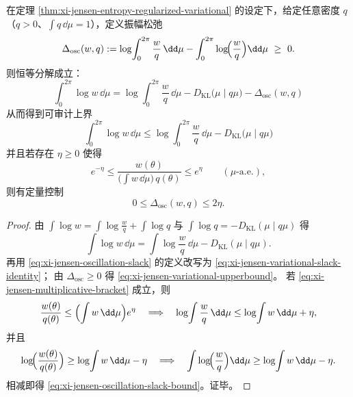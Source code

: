 \begin{proposition}\label{prop:xi-jensen-variational-upperbound-certificate}
在定理 \ref{thm:xi-jensen-entropy-regularized-variational} 的设定下，给定任意密度 \(q\)（\(q>0\)、\(\int q\,\dd\mu=1\)），定义振幅松弛
\begin{equation}\label{eq:xi-jensen-oscillation-slack}
\Delta_{\mathrm{osc}}(w,q)
:=\log\!\int_{0}^{2\pi}\frac{w}{q}\,\dd\mu-\int_{0}^{2\pi}\log\!\Bigl(\frac{w}{q}\Bigr)\dd\mu\ \ge\ 0.
\end{equation}
则恒等分解成立：
\begin{equation}\label{eq:xi-jensen-variational-slack-identity}
\boxed{\;
\int_{0}^{2\pi}\log w\,\dd\mu
=\log\!\int_{0}^{2\pi}\frac{w}{q}\,\dd\mu
-D_{\mathrm{KL}}\!\bigl(\mu\mid q\mu\bigr)
-\Delta_{\mathrm{osc}}(w,q)\;}
\end{equation}
从而得到可审计上界
\begin{equation}\label{eq:xi-jensen-variational-upperbound}
\boxed{\;
\int_{0}^{2\pi}\log w\,\dd\mu
\le
\log\!\int_{0}^{2\pi}\frac{w}{q}\,\dd\mu
-D_{\mathrm{KL}}\!\bigl(\mu\mid q\mu\bigr)\;}
\end{equation}
并且若存在 \(\eta\ge 0\) 使得
\begin{equation}\label{eq:xi-jensen-multiplicative-bracket}
e^{-\eta}\le \frac{w(\theta)}{\bigl(\int w\,\dd\mu\bigr)\,q(\theta)}\le e^{\eta}\qquad(\mu\text{-a.e.}),
\end{equation}
则有定量控制
\begin{equation}\label{eq:xi-jensen-oscillation-slack-bound}
\boxed{\;0\le \Delta_{\mathrm{osc}}(w,q)\le 2\eta.\;}
\end{equation}
\end{proposition}

\begin{proof}
由
\(
\int\log w=\int\log\frac{w}{q}+\int\log q
\)
与 \(\int\log q=-D_{\mathrm{KL}}(\mu\mid q\mu)\) 得
\[
\int\log w\,\dd\mu
=\int\log\frac{w}{q}\,\dd\mu-D_{\mathrm{KL}}(\mu\mid q\mu).
\]
再用 \eqref{eq:xi-jensen-oscillation-slack} 的定义改写为 \eqref{eq:xi-jensen-variational-slack-identity}；
由 \(\Delta_{\mathrm{osc}}\ge 0\) 得 \eqref{eq:xi-jensen-variational-upperbound}。
若 \eqref{eq:xi-jensen-multiplicative-bracket} 成立，则
\[
\frac{w(\theta)}{q(\theta)}\le \Bigl(\int w\,\dd\mu\Bigr)e^{\eta}
\quad\Longrightarrow\quad
\log\!\int\frac{w}{q}\,\dd\mu\le \log\!\int w\,\dd\mu+\eta,
\]
并且
\[
\log\!\Bigl(\frac{w(\theta)}{q(\theta)}\Bigr)\ge \log\!\int w\,\dd\mu-\eta
\quad\Longrightarrow\quad
\int\log\!\Bigl(\frac{w}{q}\Bigr)\dd\mu\ge \log\!\int w\,\dd\mu-\eta.
\]
相减即得 \eqref{eq:xi-jensen-oscillation-slack-bound}。证毕。
\end{proof}

